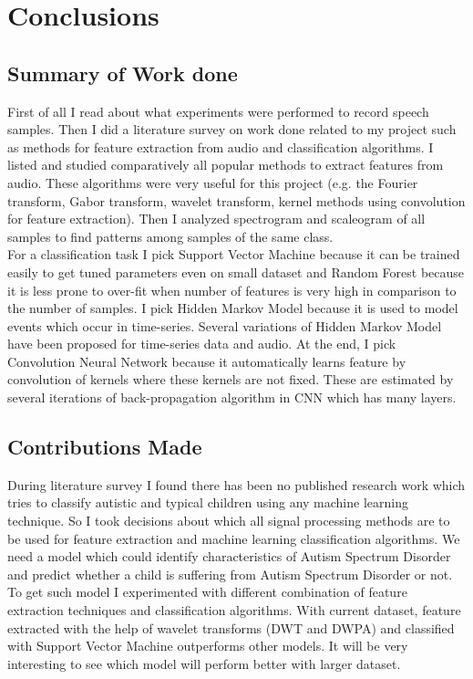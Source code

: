 \documentclass[11pt]{report}
\begin{document}
\newpage
\chapter{Conclusions} 
\section{Summary of Work done}
First of all I read about what experiments were performed to record speech samples. Then I did a literature survey on work done related to my project such as methods for feature extraction from audio and classification algorithms. I listed and studied comparatively all popular methods to extract features from audio. These algorithms were very useful for this project (e.g. the Fourier transform, Gabor transform, wavelet transform, kernel methods using convolution for feature extraction). Then I analyzed spectrogram and scaleogram of all samples to find patterns among samples of the same class.\\
 For a classification task I pick Support Vector Machine because it can be trained easily to get tuned parameters even on small dataset and Random Forest because it is less prone to over-fit when number of features is very high in comparison to the number of samples. I pick Hidden Markov Model because it is used to model events which occur in time-series. Several variations of Hidden Markov Model have been proposed for time-series data and audio. At the end, I pick Convolution Neural Network because it automatically learns feature by convolution of kernels where these kernels are not fixed. These are estimated by several iterations of back-propagation algorithm in CNN which has many layers. 


\section{Contributions Made}
During literature survey I found there has been no published research work which tries to classify autistic and typical children using any machine learning technique. So I took decisions about which all signal processing methods are to be used for feature extraction and machine learning classification algorithms. We need a model which could identify characteristics of Autism Spectrum Disorder and predict whether a child is suffering from Autism Spectrum Disorder or not. To get such model I experimented with  different combination of feature extraction techniques and classification algorithms. With current dataset, feature extracted with the help of wavelet transforms (DWT and DWPA) and classified with Support Vector Machine outperforms other models. It will be very interesting to see which model will perform better with larger dataset.
\end{document}
